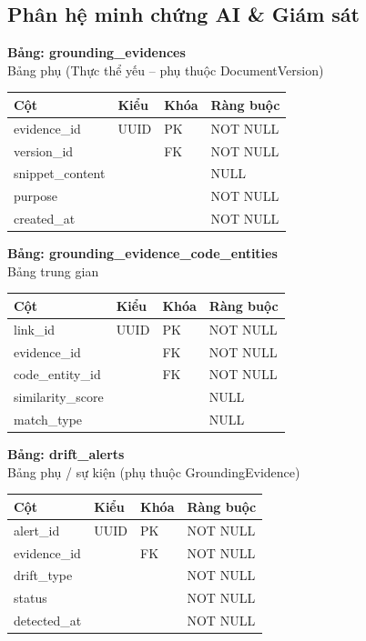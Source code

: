 \setcounter{subsection}{1} 
\subsection{ Phân hệ minh chứng AI \& Giám sát }

\textbf{Bảng: grounding\_evidences}\\
Bảng phụ (Thực thể yếu – phụ thuộc DocumentVersion)
\begin{table}[H]
\centering
\begin{tabular}{|l|l|l|l|}
\hline
\textbf{Cột} & \textbf{Kiểu} & \textbf{Khóa} & \textbf{Ràng buộc} \\ \hline
evidence\_id & UUID & PK & NOT NULL \\ \hline
version\_id & & FK & NOT NULL \\ \hline
snippet\_content & & & NULL \\ \hline
purpose & & & NOT NULL \\ \hline
created\_at & & & NOT NULL \\ \hline
\end{tabular}
\end{table}

\textbf{Bảng: grounding\_evidence\_code\_entities}\\
Bảng trung gian
\begin{table}[H]
\centering
\begin{tabular}{|l|l|l|l|}
\hline
\textbf{Cột} & \textbf{Kiểu} & \textbf{Khóa} & \textbf{Ràng buộc} \\ \hline
link\_id & UUID & PK & NOT NULL \\ \hline
evidence\_id & & FK & NOT NULL \\ \hline
code\_entity\_id & & FK & NOT NULL \\ \hline
similarity\_score & & & NULL \\ \hline
match\_type & & & NULL \\ \hline
\end{tabular}
\end{table}

\textbf{Bảng: drift\_alerts}\\
Bảng phụ / sự kiện (phụ thuộc GroundingEvidence)
\begin{table}[H]
\centering
\begin{tabular}{|l|l|l|l|}
\hline
\textbf{Cột} & \textbf{Kiểu} & \textbf{Khóa} & \textbf{Ràng buộc} \\ \hline
alert\_id & UUID & PK & NOT NULL \\ \hline
evidence\_id & & FK & NOT NULL \\ \hline
drift\_type & & & NOT NULL \\ \hline
status & & & NOT NULL \\ \hline
detected\_at & & & NOT NULL \\ \hline
\end{tabular}
\end{table}
